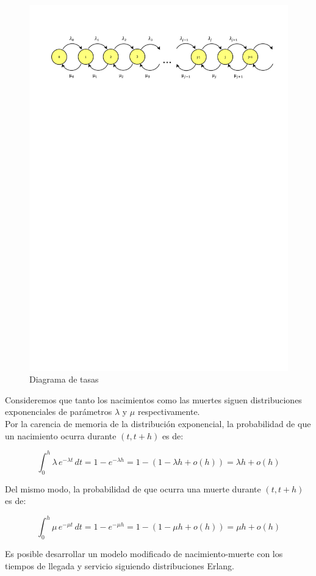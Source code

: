 \begin{figure}[h]
	\centering\includegraphics[trim = 10mm 220mm 10mm 25mm, clip,width=0.9\linewidth]{diagramatasa}
	\caption{Diagrama de tasas}
\end{figure}

Consideremos que tanto los nacimientos como las muertes siguen distribuciones exponenciales de parámetros $\lambda$ y $\mu $ respectivamente. \\
Por la carencia de memoria de la distribución exponencial, la probabilidad de que un nacimiento ocurra durante $(t,t+h)$ es de:

$$
\int_{0}^{h}  \lambda \, e^{-\lambda t} \, dt = 1-e^{-\lambda h}=1-(1-\lambda h + o(h))=\lambda h + o(h)
$$

Del mismo modo, la probabilidad de que ocurra una muerte durante $(t,t+h)$ es de:

$$
\int_{0}^{h}  \mu \, e^{-\mu t} \, dt = 1-e^{-\mu h}=1-(1-\mu h + o(h))=\mu h + o(h)
$$ 

Es posible desarrollar un modelo modificado de nacimiento-muerte con los tiempos de llegada y servicio siguiendo distribuciones Erlang.

